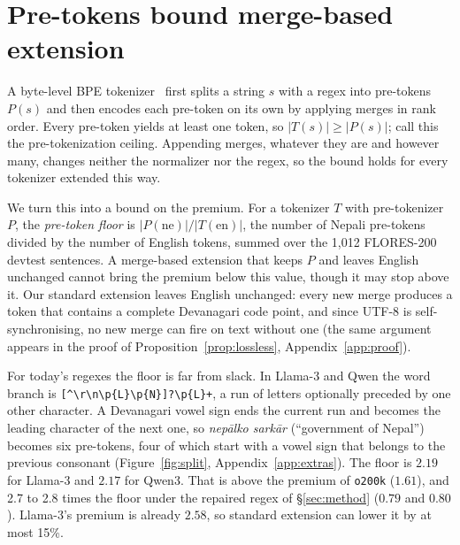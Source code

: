 \section{Pre-tokens bound merge-based extension}
\label{sec:floor}

A byte-level BPE tokenizer~\citep{sennrich-etal-2016-neural,radford2019language} first splits a string $s$ with a regex into pre-tokens $P(s)$ and then encodes each pre-token on its own by applying merges in rank order. Every pre-token yields at least one token, so $|T(s)| \ge |P(s)|$; \citet{regmi2026vowel} call this the pre-tokenization ceiling. Appending merges, whatever they are and however many, changes neither the normalizer nor the regex, so the bound holds for every tokenizer extended this way.

We turn this into a bound on the premium. For a tokenizer $T$ with pre-tokenizer $P$, the \emph{pre-token floor} is $|P(\text{ne})|/|T(\text{en})|$, the number of Nepali pre-tokens divided by the number of English tokens, summed over the 1{,}012 FLORES-200 devtest sentences. A merge-based extension that keeps $P$ and leaves English unchanged cannot bring the premium below this value, though it may stop above it. Our standard extension \RI{} leaves English unchanged: every new merge produces a token that contains a complete Devanagari code point, and since UTF-8 is self-synchronising, no new merge can fire on text without one (the same argument appears in the proof of Proposition~\ref{prop:lossless}, Appendix~\ref{app:proof}).

For today's regexes the floor is far from slack. In Llama-3 and Qwen the word branch is \texttt{[\textasciicircum\textbackslash r\textbackslash n\textbackslash p\{L\}\textbackslash p\{N\}]?\textbackslash p\{L\}+}, a run of letters optionally preceded by one other character. A Devanagari vowel sign ends the current run and becomes the leading character of the next one, so \emph{nep\=alko sark\=ar} (``government of Nepal'') becomes six pre-tokens, four of which start with a vowel sign that belongs to the previous consonant (Figure~\ref{fig:split}, Appendix~\ref{app:extras}). The floor is $2.19$ for Llama-3 and $2.17$ for Qwen3. That is above the premium of \texttt{o200k} ($1.61$), and 2.7 to 2.8 times the floor under the repaired regex of \S\ref{sec:method} ($0.79$ and $0.80$). Llama-3's premium is already $2.58$, so standard extension can lower it by at most 15\%.

